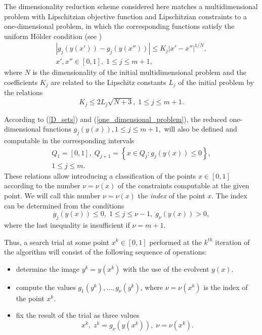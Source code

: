 \documentclass[twocolumn]{svjour3}          %
\begin{document}
	The dimensionality reduction scheme considered here matches a multidimensional problem with Lipschitzian objective function and Lipschitzian constraints to a one-dimensional problem, in which the corresponding functions satisfy the uniform H\"{o}lder condition (see \cite{Strongin2000,Sergeyev2013})
\begin{align*} 
	\left|g_j(y(x'))-g_j(y(x''))\right| \leq K_j \left|x'-x'' \right|^{1/N}, \\  
	x', x''\in [0,1], \; 1\leq j \leq m+1,
\end{align*}
where $N$ is the dimensionality of the initial multidimensional problem and the coefficients $K_j$ are related to the Lipschitz constants $L_j$ of the initial problem by the relations
\begin{equation}\label{K_leq_L}
	K_j \leq 2L_j \sqrt{N+3}, \; 1\leq j \leq m+1.
\end{equation}

	According to (\ref{D_sets}) and (\ref{one_dimensional_problem}), the reduced one-dimensional functions $g_j (y(x)), 1 \leq j \leq m+1,$ will also be defined and computable in the corresponding intervals 
\begin{align}\label{Q_intervals}
	Q_1=[0,1], \; Q_{j+1}=\left\{x \in Q_j : g_j(y(x)) \leq 0 \right\}, \nonumber \\
	1 \leq j \leq m.
\end{align}
These relations allow introducing a classification of the points $x \in [0,1]$ according to the number $\nu = \nu(x)$ of the constraints computable at the given point. We will call this number $\nu = \nu(x)$ the \textit{index} of the point $x$. The index can be determined from the conditions 
$$
	g_j(y(x)) \leq 0, \; 1 \leq j \leq \nu-1, \; g_{\nu}(y(x))>0,
$$
where the last inequality is insufficient if $\nu = m+1$. 

	Thus, a search trial at some point $x^k \in [0,1]$ performed at the $k^{th}$ iteration of the algorithm will consist of the following sequence of operations:
\begin{itemize} 
  \item determine the image $y^k=y(x^k )$ with the use of the evolvent $y(x)$. 
  \item compute the values $g_1 (y^k ), \ldots ,g_{\nu} (y^k )$, where $\nu = \nu(x^k)$ is the index of the point $x^k$.
	\item fix the result of the trial as three values 
\begin{equation}\label{trial_result}
	x^k, \; z^k = g_{\nu}\left( y(x^k) \right), \; \nu = \nu(x^k).
\end{equation}
\end{itemize}
	
\end{document}
